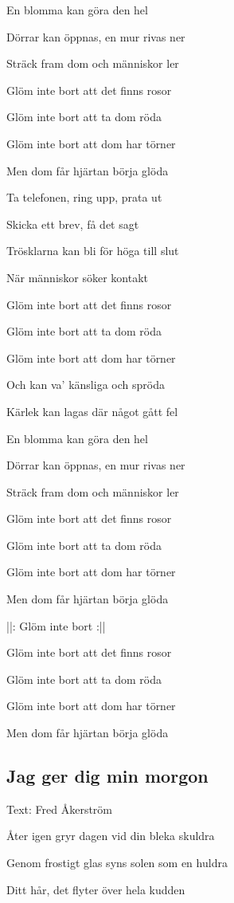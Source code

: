 En blomma kan göra den hel

Dörrar kan öppnas, en mur rivas ner

Sträck fram dom och människor ler\bigskip

Glöm inte bort att det finns rosor

Glöm inte bort att ta dom röda

Glöm inte bort att dom har törner

Men dom får hjärtan börja glöda\bigskip

Ta telefonen, ring upp, prata ut

Skicka ett brev, få det sagt

Trösklarna kan bli för höga till slut

När människor söker kontakt\bigskip

Glöm inte bort att det finns rosor

Glöm inte bort att ta dom röda

Glöm inte bort att dom har törner

Och kan va’ känsliga och spröda\bigskip

Kärlek kan lagas där något gått fel

En blomma kan göra den hel

Dörrar kan öppnas, en mur rivas ner

Sträck fram dom och människor ler\bigskip

Glöm inte bort att det finns rosor

Glöm inte bort att ta dom röda

Glöm inte bort att dom har törner

Men dom får hjärtan börja glöda\bigskip

||: Glöm inte bort :||\bigskip

Glöm inte bort att det finns rosor

Glöm inte bort att ta dom röda

Glöm inte bort att dom har törner

Men dom får hjärtan börja glöda

\subsection{\textbf{Jag ger dig min morgon}}

Text: Fred Åkerström\bigskip

Åter igen gryr dagen vid din bleka skuldra

Genom frostigt glas syns solen som en huldra

Ditt hår, det flyter över hela kudden


